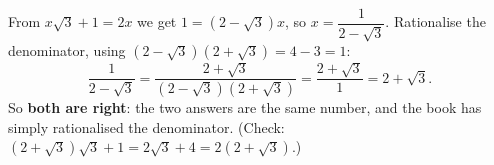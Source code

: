 From $x\sqrt3+1=2x$ we get $1=(2-\sqrt3)x$, so $x=\dfrac{1}{2-\sqrt3}$. Rationalise the denominator, using $(2-\sqrt3)(2+\sqrt3)=4-3=1$:
\[
\dfrac{1}{2-\sqrt3}=\dfrac{2+\sqrt3}{(2-\sqrt3)(2+\sqrt3)}=\dfrac{2+\sqrt3}{1}=2+\sqrt3 .
\]
So \textbf{both are right}: the two answers are the same number, and the book has simply rationalised the denominator. (Check: $(2+\sqrt3)\sqrt3+1=2\sqrt3+4=2(2+\sqrt3)$.)
